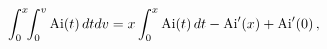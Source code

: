 \[\int_{0}^{x}\!\!\int_{0}^{v}\mathop{\mathrm{Ai}\/}\nolimits\!\left(t\right)%
dtdv=x\int_{0}^{x}\mathop{\mathrm{Ai}\/}\nolimits\!\left(t\right)dt-\mathop{%
\mathrm{Ai}\/}\nolimits'\!\left(x\right)+\mathop{\mathrm{Ai}\/}\nolimits'\!%
\left(0\right),\]